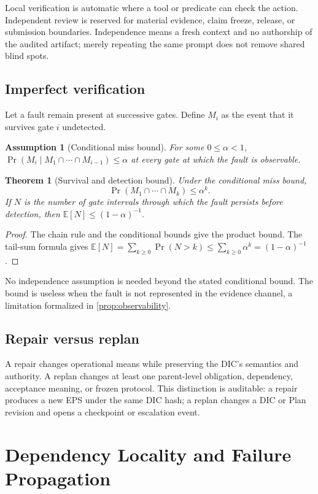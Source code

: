 \documentclass[11pt]{article}
\newtheorem{assumption}[definition]{Assumption}
\newtheorem{theorem}[definition]{Theorem}
\begin{document}
Local verification is automatic where a tool or predicate can check the action. Independent review is reserved for material evidence, claim freeze, release, or submission boundaries. Independence means a fresh context and no authorship of the audited artifact; merely repeating the same prompt does not remove shared blind spots.

\subsection{Imperfect verification}
Let a fault remain present at successive gates. Define $M_i$ as the event that it survives gate $i$ undetected.
\begin{assumption}[Conditional miss bound]
For some $0\le\alpha<1$,
$\Pr(M_i\mid M_1\cap\cdots\cap M_{i-1})\le\alpha$ at every gate at which the fault is observable.
\end{assumption}
\begin{theorem}[Survival and detection bound]
\label{thm:miss}
Under the conditional miss bound,
\[
\Pr(M_1\cap\cdots\cap M_k)\le\alpha^k.
\]
If $N$ is the number of gate intervals through which the fault persists before detection, then $\mathbb E[N]\le(1-\alpha)^{-1}$.
\end{theorem}
\begin{proof}
The chain rule and the conditional bounds give the product bound. The tail-sum formula gives
$\mathbb E[N]=\sum_{k\ge0}\Pr(N>k)\le\sum_{k\ge0}\alpha^k=(1-\alpha)^{-1}$.
\end{proof}
No independence assumption is needed beyond the stated conditional bound. The bound is useless when the fault is not represented in the evidence channel, a limitation formalized in \ref{prop:observability}.

\subsection{Repair versus replan}
A repair changes operational means while preserving the DIC's semantics and authority. A replan changes at least one parent-level obligation, dependency, acceptance meaning, or frozen protocol. This distinction is auditable: a repair produces a new EPS under the same DIC hash; a replan changes a DIC or Plan revision and opens a checkpoint or escalation event.

\section{Dependency Locality and Failure Propagation}
\end{document}
